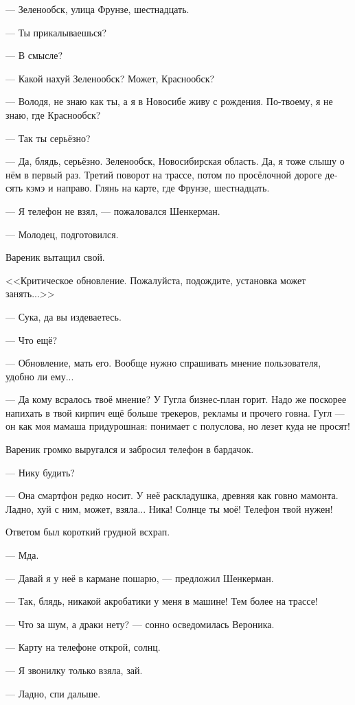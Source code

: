 \documentclass[a5paper,12pt,fleqn]{extbook}\usepackage{cooltooltips}\usepackage{polyglossia}\setdefaultlanguage[babelshorthands=true]{russian}\setotherlanguage{english}\defaultfontfeatures{Ligatures=TeX,Mapping=tex-text} \usepackage{xcolor}\definecolor{lightgray}{HTML}{bbbbbb}\color{lightgray}\newcommand{\ml}[3]{\textenglish{\textcolor{black}{#3}}}
\begin{document}
--- Зеленообск, улица Фрунзе, шестнадцать.

--- Ты прикалываешься?

--- В смысле?

--- Какой нахуй Зеленообск?
Может, Краснообск?

--- Володя, не знаю как ты, а я в Новосибе живу с рождения.
По-твоему, я не знаю, где Краснообск?

--- Так ты серьёзно?

--- Да, блядь, серьёзно.
Зеленообск, Новосибирская область.
Да, я тоже слышу о нём в первый раз.
Третий поворот на трассе, потом по просёлочной дороге десять кэмэ и направо.
Глянь на карте, где Фрунзе, шестнадцать.

--- Я телефон не взял, --- пожаловался Шенкерман.

--- Молодец, подготовился.

Вареник вытащил свой.

<<Критическое обновление.
Пожалуйста, подождите, установка может занять...>>

--- Сука, да вы издеваетесь.

--- Что ещё?

--- Обновление, мать его.
Вообще нужно спрашивать мнение пользователя, удобно ли ему...

--- Да кому всралось твоё мнение?
У Гугла бизнес-план горит.
Надо же поскорее напихать в твой кирпич ещё больше трекеров, рекламы и прочего говна.
Гугл --- он как моя мамаша придурошная: понимает с полуслова, но лезет куда не просят!

Вареник громко выругался и забросил телефон в бардачок.

--- Нику будить?

--- Она смартфон редко носит.
У неё раскладушка, древняя как говно мамонта.
Ладно, хуй с ним, может, взяла...
Ника!
Солнце ты моё!
Телефон твой нужен!

Ответом был короткий грудной всхрап.

--- Мда.

--- Давай я у неё в кармане пошарю, --- предложил Шенкерман.

--- Так, блядь, никакой акробатики у меня в машине!
Тем более на трассе!

--- Что за шум, а драки нету? --- сонно осведомилась Вероника.

--- Карту на телефоне открой, солнц.

--- Я звонилку только взяла, зай.

--- Ладно, спи дальше.
\end{document}

